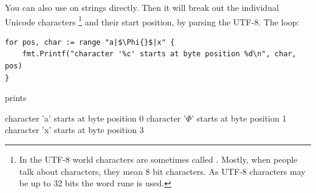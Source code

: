 You can also use  on strings directly. Then it
will break out the individual Unicode characters 
\footnote{In the UTF-8 world characters are sometimes called . 
Mostly, when people talk about
characters, they mean 8 bit characters. As UTF-8 characters may be up to 32 bits the word
rune is used.} and their start position, by parsing the UTF-8.
The loop: 
\begin{lstlisting}
for pos, char := range "a|$\Phi{}$|x" {
    fmt.Printf("character '%c' starts at byte position %d\n", char, pos)
}
\end{lstlisting}
prints
\begin{display}
character 'a' starts at byte position 0
character '\begin{math}\Phi\end{math}' starts at byte position 1
character 'x' starts at byte position 3 
\end{display}


